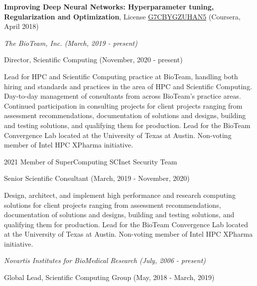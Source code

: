 \documentclass[11pt,article,oneside]{memoir}
\begin{document}
\ind \textbf{Improving Deep Neural Networks: Hyperparameter tuning, Regularization and Optimization}, License \href{Improving Deep Neural Networks: Hyperparameter tuning, Regularization and Optimization}{G7CBYGZUHAN5} (Coursera, April 2018)
\bigskip

\medskip
\noindent\emph{The BioTeam, Inc. (March, 2019 - present) \vspace{0.01in}}

\ind \footnotesize Director, Scientific Computing (November, 2020 - present)

\ind \hspace{0.35in} \footnotesize Lead for HPC and Scientific Computing practice at BioTeam, handling both hiring and standards and practices in the area of HPC and Scientific Computing. Day-to-day management of consultants from across BioTeam's practice areas. Continued participation in consulting projects for client projects ranging
from assessment recommendations, documentation of solutions and designs, building and testing solutions, and qualifying them for production. Lead for the BioTeam Convergence Lab located at the University of Texas at Austin. Non-voting member of Intel HPC XPharma initiative.

\medskip
\ind \hspace{0.35in} \footnotesize 2021 Member of SuperComputing SCInet Security Team
\medskip

\ind \footnotesize Senior Scientific Consultant (March, 2019 - November, 2020)

\ind \hspace{0.35in} \footnotesize Design, architect, and implement high performance and research computing solutions for client projects ranging from assessment recommendations, documentation of solutions and designs, building and testing solutions, and qualifying them for production. Lead for the BioTeam Convergence Lab located at the University of Texas at Austin. Non-voting member of Intel HPC XPharma initiative.

\vspace{-0.075in}

\normalsize

\bigskip
\noindent\emph{Novartis Institutes for BioMedical Research (July, 2006 - present) \vspace{0.01in}}

\ind \footnotesize Global Lead, Scientific Computing Group (May, 2018 - March, 2019)
\end{document}
